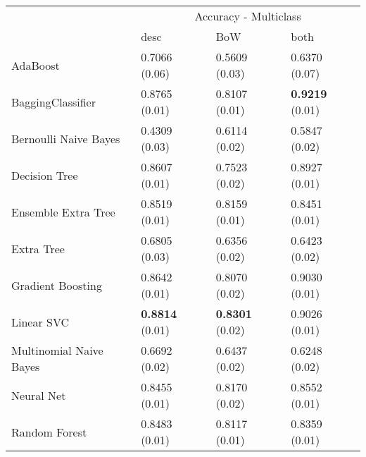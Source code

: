 \begin{tabular}{|l|l|l|l| }
\hline
 &  \multicolumn{3}{c|}{ Accuracy - Multiclass} \\
\cline{2-4} & desc & BoW & both \\ \hline
AdaBoost                & 0.7066 (0.06) & 0.5609 (0.03) & 0.6370 (0.07)\\
BaggingClassifier       & 0.8765 (0.01) & 0.8107 (0.01) & {\bf 0.9219} (0.01)\\
Bernoulli Naive Bayes   & 0.4309 (0.03) & 0.6114 (0.02) & 0.5847 (0.02)\\
Decision Tree           & 0.8607 (0.01) & 0.7523 (0.02) & 0.8927 (0.01)\\
Ensemble Extra Tree     & 0.8519 (0.01) & 0.8159 (0.01) & 0.8451 (0.01)\\
Extra Tree              & 0.6805 (0.03) & 0.6356 (0.02) & 0.6423 (0.02)\\
Gradient Boosting       & 0.8642 (0.01) & 0.8070 (0.02) & 0.9030 (0.01)\\
Linear SVC              & {\bf 0.8814} (0.01) & {\bf 0.8301} (0.02) & 0.9026 (0.01)\\
Multinomial Naive Bayes & 0.6692 (0.02) & 0.6437 (0.02) & 0.6248 (0.02)\\
Neural Net              & 0.8455 (0.01) & 0.8170 (0.02) & 0.8552 (0.01)\\
Random Forest           & 0.8483 (0.01) & 0.8117 (0.01) & 0.8359 (0.01)\\
\hline
\end{tabular}